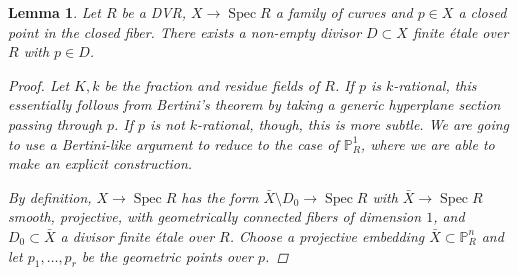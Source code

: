 \documentclass[11pt]{amsart}
\theoremstyle{plain}
\newtheorem{lemma}[theorem]{Lemma}
\theoremstyle{definition}
\newcommand{\on}{\operatorname}
\newcommand{\1}{\mathbb{1}}
\newcommand{\spec}{\on{Spec}}
\renewcommand{\P}{\mathbb{P}}
\begin{document}
\begin{lemma}
    Let $R$ be a DVR, $X\to \spec R$ a family of curves and $p\in X$ a closed point in the closed fiber. There exists a non-empty divisor $D\subset X$ finite étale over $R$ with $p\in D$.
	\begin{proof}
		
		
		
		
		
		
		Let $K,k$ be the fraction and residue fields of $R$. If $p$ is $k$-rational, this essentially follows from Bertini's theorem by taking a generic hyperplane section passing through $p$. If $p$ is not $k$-rational, though, this is more subtle. We are going to use a Bertini-like argument to reduce to the case of $\P^{1}_{R}$, where we are able to make an explicit construction.
		
		By definition, $X\to\spec R$ has the form $\bar{X}\setminus D_{0}\to\spec R$ with $\bar{X}\to\spec R$ smooth, projective, with geometrically connected fibers of dimension $1$, and $D_{0}\subset\bar{X}$ a divisor finite étale over $R$. Choose a projective embedding $\bar{X}\subset\P^{n}_{R}$ and let $p_{1},\dots,p_{r}$ be the geometric points over $p$.
			

\end{proof}
\end{lemma}
\end{document}
